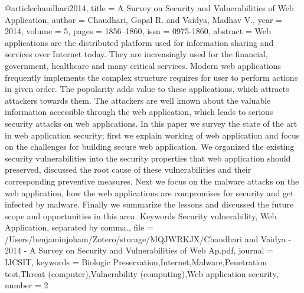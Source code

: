 @article{chaudhari2014,
  title = {A {{Survey}} on {{Security}} and {{Vulnerabilities}} of {{Web Application}}},
  author = {Chaudhari, Gopal R. and Vaidya, Madhav V.},
  year = {2014},
  volume = {5},
  pages = {1856--1860},
  issn = {0975-1860},
  abstract = {Web applications are the distributed platform used for information sharing and services over Internet today. They are increasingly used for the financial, government, healthcare and many critical services. Modern web applications frequently implements the complex structure requires for user to perform actions in given order. The popularity adds value to these applications, which attracts attackers towards them. The attackers are well known about the valuable information accessible through the web application, which leads to serious security attacks on web applications. In this paper we survey the state of the art in web application security; first we explain working of web application and focus on the challenges for building secure web application. We organized the existing security vulnerabilities into the security properties that web application should preserved, discussed the root cause of these vulnerabilities and their corresponding preventive measures. Next we focus on the malware attacks on the web application, how the web applications are compromises for security and get infected by malware. Finally we summarize the lessons and discussed the future scope and opportunities in this area. Keywords\textemdash{} Security vulnerability, Web Application, separated by comma.},
  file = {/Users/benjaminjoham/Zotero/storage/MQJWRKJX/Chaudhari and Vaidya - 2014 - A Survey on Security and Vulnerabilities of Web Ap.pdf},
  journal = {IJCSIT},
  keywords = {Biologic Preservation,Internet,Malware,Penetration test,Threat (computer),Vulnerability (computing),Web application security},
  number = {2}
}

